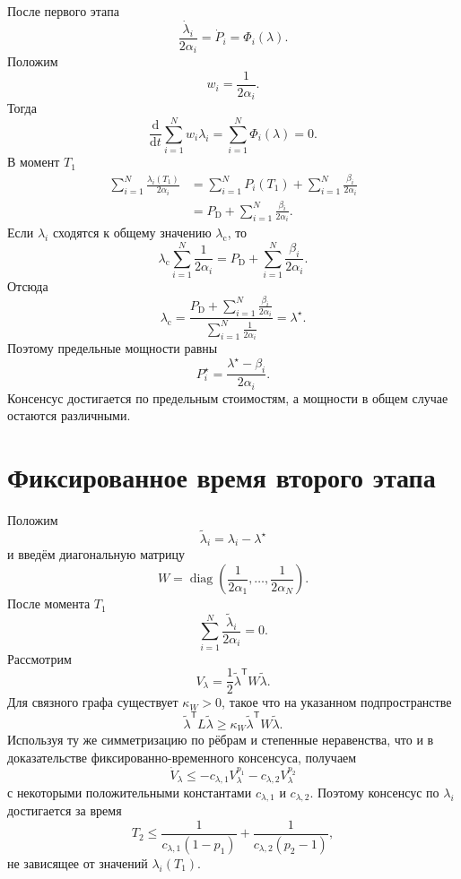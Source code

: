 После первого этапа
\[
    \frac{\dot\lambda_i}{2\alpha_i}
    =
    \dot P_i
    =
    \Phi_i(\lambda).
\]
Положим
\[
    w_i=\frac1{2\alpha_i}.
\]
Тогда
\[
    \frac{\mathrm d}{\mathrm dt}
    \sum_{i=1}^{N}w_i\lambda_i
    =
    \sum_{i=1}^{N}\Phi_i(\lambda)
    =0.
\]
В момент \(T_1\)
\[
\begin{aligned}
    \sum_{i=1}^{N}\frac{\lambda_i(T_1)}{2\alpha_i}
    &=
    \sum_{i=1}^{N}P_i(T_1)
    +
    \sum_{i=1}^{N}\frac{\beta_i}{2\alpha_i}
    \\
    &=
    P_{\mathrm D}
    +
    \sum_{i=1}^{N}\frac{\beta_i}{2\alpha_i}.
\end{aligned}
\]
Если \(\lambda_i\) сходятся к общему значению
\(\lambda_{\mathrm c}\), то
\[
    \lambda_{\mathrm c}
    \sum_{i=1}^{N}\frac1{2\alpha_i}
    =
    P_{\mathrm D}
    +
    \sum_{i=1}^{N}\frac{\beta_i}{2\alpha_i}.
\]
Отсюда
\[
    \lambda_{\mathrm c}
    =
    \frac{
        P_{\mathrm D}
        +
        \displaystyle\sum_{i=1}^{N}
        \frac{\beta_i}{2\alpha_i}
    }{
        \displaystyle\sum_{i=1}^{N}
        \frac1{2\alpha_i}
    }
    =
    \lambda^\star.
\]
Поэтому предельные мощности равны
\[
    P_i^\star
    =
    \frac{\lambda^\star-\beta_i}{2\alpha_i}.
\]
Консенсус достигается по предельным стоимостям, а мощности в общем
случае остаются различными.

\section{Фиксированное время второго этапа}

Положим
\[
    \widetilde\lambda_i=\lambda_i-\lambda^\star
\]
и введём диагональную матрицу
\[
    W
    =
    \operatorname{diag}
    \left(
        \frac1{2\alpha_1},\ldots,
        \frac1{2\alpha_N}
    \right).
\]
После момента \(T_1\)
\[
    \sum_{i=1}^{N}
    \frac{\widetilde\lambda_i}{2\alpha_i}=0.
\]
Рассмотрим
\[
    V_\lambda
    =
    \frac12
    \widetilde\lambda^{\mathsf T}
    W\widetilde\lambda.
\]
Для связного графа существует \(\kappa_W>0\), такое что на
указанном подпространстве
\[
    \widetilde\lambda^{\mathsf T}
    L\widetilde\lambda
    \ge
    \kappa_W
    \widetilde\lambda^{\mathsf T}
    W\widetilde\lambda.
\]
Используя ту же симметризацию по рёбрам и степенные неравенства, что
и в доказательстве фиксированно-временного консенсуса, получаем
\[
    \dot V_\lambda
    \le
    -c_{\lambda,1}V_\lambda^{p_1}
    -c_{\lambda,2}V_\lambda^{p_2}
\]
с некоторыми положительными константами
\(c_{\lambda,1}\) и \(c_{\lambda,2}\). Поэтому консенсус по
\(\lambda_i\) достигается за время
\[
    T_2
    \le
    \frac1{c_{\lambda,1}(1-p_1)}
    +
    \frac1{c_{\lambda,2}(p_2-1)},
\]
не зависящее от значений \(\lambda_i(T_1)\).

